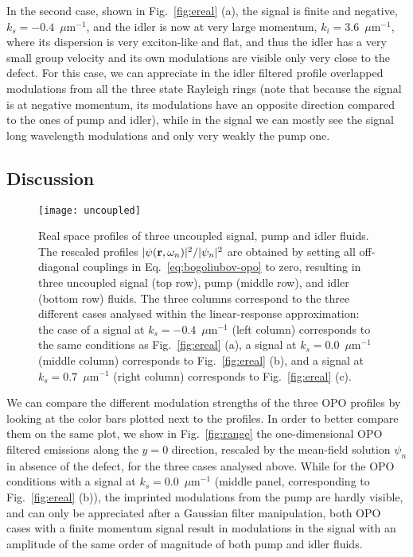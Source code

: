 In the second case, shown in Fig.~\ref{fig:ereal} (a), the signal is
finite and negative, $k_s = -0.4$~$\mu$m$^{-1}$, and the idler is now
at very large momentum, $k_i = 3.6$~$\mu$m$^{-1}$, where its
dispersion is very exciton-like and flat, and thus the idler has a
very small group velocity and its own modulations are visible only
very close to the defect. For this case, we can appreciate in the
idler filtered profile overlapped modulations from all the three state
Rayleigh rings (note that because the signal is at negative momentum,
its modulations have an opposite direction compared to the ones of
pump and idler), while in the signal we can mostly see the signal long
wavelength modulations and only very weakly the pump one.

\subsection{Discussion}
%
\begin{figure}[tb]\centering
\texttt{[image: uncoupled]}
\caption{Real space profiles of three uncoupled signal, pump and idler
  fluids. The rescaled profiles $|\psi (\mathbf{r},\omega_n)|^2/|\psi_n|^2$
  are obtained by setting all off-diagonal couplings in
  Eq.~\eqref{eq:bogoliubov-opo} to zero, resulting in three uncoupled
  signal (top row), pump (middle row), and idler (bottom row)
  fluids. The three columns correspond to the three different cases
  analysed within the linear-response approximation: the case
  of a signal at $k_s = -0.4$~$\mu$m$^{-1}$ (left column) corresponds to
  the same conditions as Fig.~\ref{fig:ereal} (a), a signal at $k_s =
  0.0$~$\mu$m$^{-1}$ (middle column) corresponds to Fig.~\ref{fig:ereal}
  (b), and a signal at $k_s = 0.7$~$\mu$m$^{-1}$ (right column)
  corresponds to Fig.~\ref{fig:ereal} (c).}
\label{fig:uncou}
\end{figure}
%
We can compare the different modulation strengths of the three OPO
profiles by looking at the color bars plotted next to the profiles. In
order to better compare them on the same plot, we show in
Fig.~\ref{fig:range} the one-dimensional OPO filtered emissions along
the $y=0$ direction, rescaled by the mean-field solution $\psi_n$ in
absence of the defect, for the three cases analysed above. While for
the OPO conditions with a signal at $k_s = 0.0$~$\mu$m$^{-1}$ (middle
panel, corresponding to Fig.~\ref{fig:ereal} (b)), the imprinted
modulations from the pump are hardly visible, and can only be
appreciated after a Gaussian filter manipulation, both OPO cases with
a finite momentum signal result in modulations in the signal with an
amplitude of the same order of magnitude of both pump and idler
fluids.

